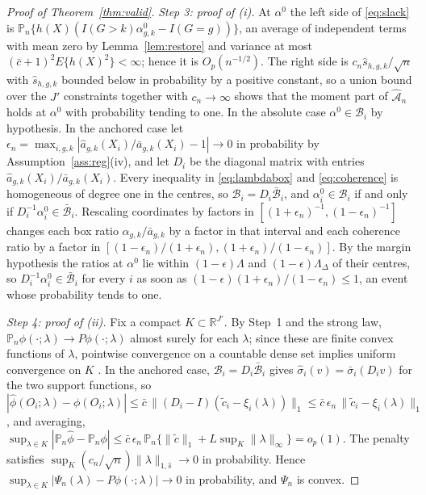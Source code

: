 \documentclass[12pt]{article}
\theoremstyle{remark}
\begin{document}
\begin{proof}[Proof of Theorem~\ref{thm:valid}]
\emph{Step 3: proof of (i).} At $\alpha^0$ the left side of \eqref{eq:slack} is
$\mathbb{P}_n\{h(X)(I(G{>}k)\alpha^0_{g,k} - I(G{=}g))\}$, an average of independent terms
with mean zero by Lemma~\ref{lem:restore} and variance at most $(\bar c + 1)^2 E\{h(X)^2\}
< \infty$; hence it is $O_p(n^{-1/2})$. The right side is $c_n\widehat s_{h,g,k}/\sqrt n$
with $\widehat s_{h,g,k}$ bounded below in probability by a positive constant, so a union
bound over the $J'$ constraints together with $c_n \to \infty$ shows that the moment part
of $\widehat{\mathcal{A}}_n$ holds at $\alpha^0$ with probability tending to one. In the absolute case $\alpha^0 \in \mathcal{B}_i$
by hypothesis. In the anchored case let $\epsilon_n = \max_{i,g,k}|\widehat a_{g,k}(X_i)/
\bar a_{g,k}(X_i) - 1| \to 0$ in probability by Assumption~\ref{ass:reg}(iv), and let $D_i$
be the diagonal matrix with entries $\widehat a_{g,k}(X_i)/\bar a_{g,k}(X_i)$. Every
inequality in \eqref{eq:lambdabox} and \eqref{eq:coherence} is homogeneous of degree one in
the centres, so $\mathcal{B}_i = D_i\bar{\mathcal{B}}_i$, and $\alpha^0_i \in \mathcal{B}_i$
if and only if $D_i^{-1}\alpha^0_i \in \bar{\mathcal{B}}_i$. Rescaling coordinates by
factors in $[(1{+}\epsilon_n)^{-1}, (1{-}\epsilon_n)^{-1}]$ changes each box ratio
$\alpha_{g,k}/\bar a_{g,k}$ by a factor in that interval and each coherence ratio by a
factor in $[(1{-}\epsilon_n)/(1{+}\epsilon_n), (1{+}\epsilon_n)/(1{-}\epsilon_n)]$. By the
margin hypothesis the ratios at $\alpha^0$ lie within $(1{-}\epsilon)\Lambda$ and
$(1{-}\epsilon)\Lambda_\Delta$ of their centres, so $D_i^{-1}\alpha^0_i \in \bar{\mathcal{B}}_i$
for every $i$ as soon as $(1{-}\epsilon)(1{+}\epsilon_n)/(1{-}\epsilon_n) \le 1$, an event
whose probability tends to one.

\emph{Step 4: proof of (ii).} Fix a compact $K \subset \mathbb{R}^{J'}$. By Step~1 and the
strong law, $\mathbb{P}_n\phi(\cdot;\lambda) \to P\phi(\cdot;\lambda)$ almost surely for
each $\lambda$; since these are finite convex functions of $\lambda$, pointwise convergence
on a countable dense set implies uniform convergence on $K$
\citep[Theorem~10.8]{rockafellar1970convex}. In the anchored case, $\mathcal{B}_i = D_i
\bar{\mathcal{B}}_i$ gives $\widehat\sigma_i(v) = \bar\sigma_i(D_i v)$ for the two support
functions, so $|\widehat\phi(O_i;\lambda) - \phi(O_i;\lambda)| \le \bar c\,\|(D_i - I)
(\tilde c_i - \xi_i(\lambda))\|_1 \le \bar c\,\epsilon_n\,\|\tilde c_i - \xi_i(\lambda)\|_1$,
and averaging, $\sup_{\lambda \in K}|\mathbb{P}_n\widehat\phi - \mathbb{P}_n\phi| \le
\bar c\,\epsilon_n\,\mathbb{P}_n\{\|\tilde c\|_1 + L\sup_K\|\lambda\|_\infty\} = o_p(1)$.
The penalty satisfies $\sup_{K}(c_n/\sqrt n)\|\lambda\|_{1,\widehat s} \to 0$ in
probability. Hence
$\sup_{\lambda \in K}|\Psi_n(\lambda) - P\phi(\cdot;\lambda)| \to 0$ in probability, and
$\Psi_n$ is convex.


\end{proof}
\end{document}
